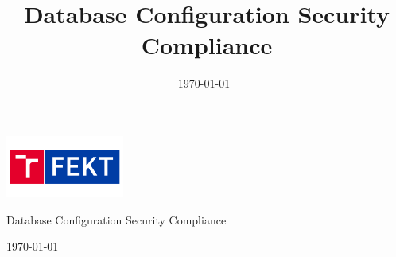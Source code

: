 \documentclass{article}
\title{Database Configuration Security Compliance}
\date{\today\ \currenttime}
\begin{document}
\begin{titlepage}
\centering
{}
\includegraphics[width=39mm]{imgs/fekt.png}\\[1cm]
{\Huge Database Configuration Security Compliance\par}
\vspace{1cm}
{\Large\today\ \currenttime\par}
\end{titlepage}




\newpage

\newpage

\newpage



\newpage



\end{document}
